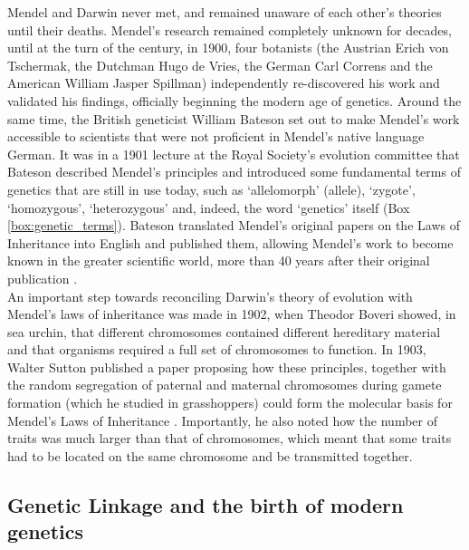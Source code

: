 Mendel and Darwin never met, and remained unaware of each other’s theories until their deaths. 
Mendel’s research remained completely unknown for decades, until at the turn of the century, in 1900, four botanists (the Austrian Erich von Tschermak, the Dutchman Hugo de Vries, the German Carl Correns and the American William Jasper Spillman) independently re-discovered his work and validated his findings, officially beginning the modern age of genetics.
Around the same time, the British geneticist William Bateson set out to make Mendel’s work accessible to scientists that were not proficient in Mendel’s native language German.
It was in a 1901 lecture at the Royal Society's evolution committee that Bateson described Mendel's principles and introduced some fundamental terms of genetics that are still in use today, such as `allelomorph' (allele), `zygote', `homozygous', `heterozygous' and, indeed, the word `genetics' itself (Box \ref{box:genetic_terms}).
Bateson translated Mendel’s original papers on the Laws of Inheritance into English and published them, allowing Mendel’s work to become known in the greater scientific world, more than 40 years after their original publication \cite{bateson2013mendel}.\\ 

An important step towards reconciling Darwin’s theory of evolution with Mendel’s laws of inheritance was made in 1902, when Theodor Boveri showed, in sea urchin, that different chromosomes contained different hereditary material and that organisms required a full set of chromosomes to function. 
In 1903, Walter Sutton published a paper proposing how these principles, together with the random segregation of paternal and maternal chromosomes during gamete formation (which he studied in grasshoppers) could form the molecular basis for Mendel’s Laws of Inheritance \cite{sutton1903chromosomes}. 
Importantly, he also noted how the number of traits was much larger than that of chromosomes, which meant that some traits had to be located on the same chromosome and be transmitted together.

\subsection{Genetic Linkage and the birth of modern genetics} %
\label{sec:Morgan}

